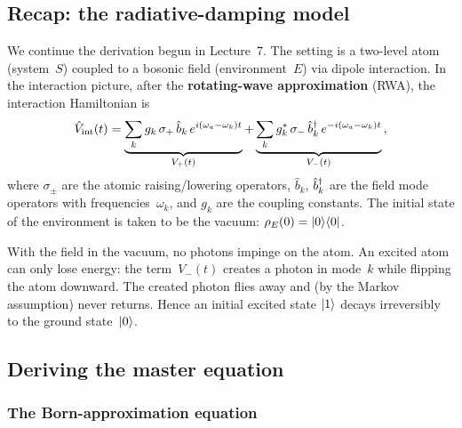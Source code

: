 

\subsection{Recap: the radiative-damping model}%
\label{sec:radiative-damping-recap}

We continue the derivation begun in Lecture~7.  The setting is a
two-level atom (system~$S$) coupled to a bosonic field (environment~$E$)
via dipole interaction.  In the interaction picture, after the
\textbf{rotating-wave approximation} (RWA), the interaction Hamiltonian
is
\begin{equation}\label{eq:V-int-RWA}
  \hat{V}_{\mathrm{int}}(t)
  = \underbrace{\sum_k g_k\,\sigma_+\, \hat{b}_k\, e^{i(\omega_a - \omega_k)t}}_{V_+(t)}
  + \underbrace{\sum_k g_k^*\,\sigma_-\, \hat{b}_k^\dagger\, e^{-i(\omega_a - \omega_k)t}}_{V_-(t)}\,,
\end{equation}
where $\sigma_\pm$ are the atomic raising/lowering operators,
$\hat{b}_k$, $\hat{b}_k^\dagger$ are the field mode operators with
frequencies~$\omega_k$, and $g_k$ are the coupling constants.  The
initial state of the environment is taken to be the vacuum:
$\rho_E(0) = \lvert 0 \rangle\langle 0 \rvert$.

\begin{intuition}
  With the field in the vacuum, no photons impinge on the atom.
  An excited atom can only lose energy: the term~$V_-(t)$ creates
  a photon in mode~$k$ while flipping the atom downward.  The created
  photon flies away and (by the Markov assumption) never returns.
  Hence an initial excited state $\lvert 1 \rangle$ decays irreversibly to the
  ground state~$\lvert 0 \rangle$.
\end{intuition}

\subsection{Deriving the master equation}%
\label{sec:master-eq-derivation}

\subsubsection{The Born-approximation equation}


